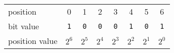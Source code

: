 
\begin{tabular}{l|ccccccc} \hline
position       & 0          & 1          & 2          & 3          & 4          & 5          & 6 \\
bit value      & \texttt{1} & \texttt{0} & \texttt{0} & \texttt{0} & \texttt{1} & \texttt{0} & \texttt{1} \\
position value & $2^6$      & $2^5$      & $2^4$      & $2^3$      & $2^2$      & $2^1$      & $2^0$ \\\hline
\end{tabular}

